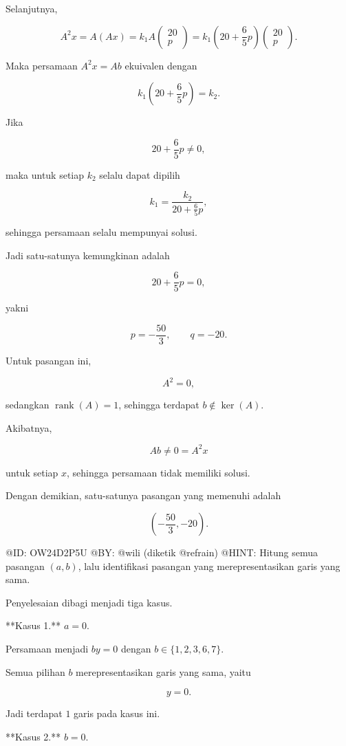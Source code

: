 Selanjutnya,

$$
A^2x=A(Ax)
=
k_1A
\begin{pmatrix}
20\\
p
\end{pmatrix}
=
k_1\left(20+\frac65p\right)
\begin{pmatrix}
20\\
p
\end{pmatrix}.
$$

Maka persamaan $A^2x=Ab$ ekuivalen dengan

$$
k_1\left(20+\frac65p\right)=k_2.
$$

Jika

$$
20+\frac65p\ne0,
$$

maka untuk setiap $k_2$ selalu dapat dipilih

$$
k_1=\frac{k_2}{20+\frac65p},
$$

sehingga persamaan selalu mempunyai solusi.

Jadi satu-satunya kemungkinan adalah

$$
20+\frac65p=0,
$$

yakni

$$
p=-\frac{50}{3},
\qquad
q=-20.
$$

Untuk pasangan ini,

$$
A^2=0,
$$

sedangkan $\operatorname{rank}(A)=1$, sehingga terdapat $b\notin\ker(A)$.

Akibatnya,

$$
Ab\ne0=A^2x
$$

untuk setiap $x$, sehingga persamaan tidak memiliki solusi.

Dengan demikian, satu-satunya pasangan yang memenuhi adalah

$$
\boxed{\left(-\frac{50}{3},-20\right).}
$$

@ID: OW24D2P5U
@BY: @wili (diketik @refrain)
@HINT: Hitung semua pasangan $(a,b)$, lalu identifikasi pasangan yang merepresentasikan garis yang sama.

Penyelesaian dibagi menjadi tiga kasus.

**Kasus 1.** $a=0$.

Persamaan menjadi $by=0$ dengan $b\in\{1,2,3,6,7\}$.

Semua pilihan $b$ merepresentasikan garis yang sama, yaitu

$$
y=0.
$$

Jadi terdapat $1$ garis pada kasus ini.

**Kasus 2.** $b=0$.


